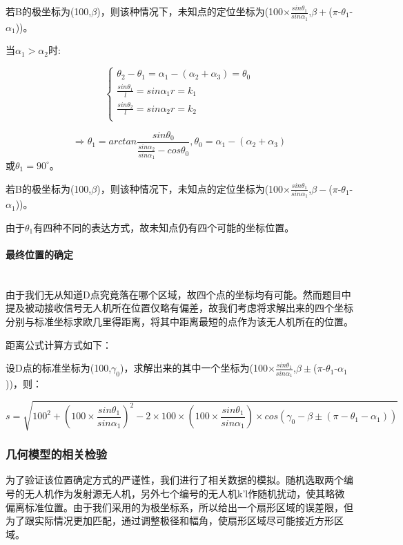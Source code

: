 \documentclass{ctexart}
\newcommand{\subsubsubsection}[1]{\paragraph{#1}\mbox{}\\}
\begin{document}
若B的极坐标为(100,$\beta$)，则该种情况下，未知点的定位坐标为(100$\times\frac{sin\theta_1}{sin\alpha_1}$,$\beta +$($\pi$-$\theta_1$-$\alpha_1$))。


当$\alpha_1 > \alpha_2$时:

\begin{equation}
    \left\{
              \begin{array}{ll}
                \theta_2-\theta_1=\alpha_1-(\alpha_2+\alpha_3)=\theta_0\\
                \frac{sin\theta_1}{l}={sin\alpha_1}{r}=k_1\\
                \frac{sin\theta_2}{l}={sin\alpha_2}{r}=k_2\\

              \end{array}
            \right.
\end{equation}

\[
    \Rightarrow \theta_1=arctan\frac{sin\theta_0}{\frac{sin\alpha_2}{sin\alpha_1}-cos\theta_0},\theta_0=\alpha_1-(\alpha_2+\alpha_3)
\]
或$\theta_1=90^{\circ}$。

若B的极坐标为(100,$\beta$)，则该种情况下，未知点的定位坐标为(100$\times\frac{sin\theta_1}{sin\alpha_1}$,$\beta -$($\pi$-$\theta_1$-$\alpha_1$))。

由于$\theta_1$有四种不同的表达方式，故未知点仍有四个可能的坐标位置。 

\subsubsubsection{最终位置的确定}

由于我们无从知道D点究竟落在哪个区域，故四个点的坐标均有可能。然而题目中提及被动接收信号无人机所在位置仅略有偏差，故我们考虑将求解出来的四个坐标分别与标准坐标求欧几里得距离，将其中距离最短的点作为该无人机所在的位置。

距离公式计算方式如下：

设D点的标准坐标为(100,$\gamma_0$)，求解出来的其中一个坐标为(100$\times\frac{sin\theta_1}{sin\alpha_1}$,$\beta \pm$($\pi$-$\theta_1$-$\alpha_1$))，则：

\[
 s=\sqrt{100^2+(100\times\frac{sin\theta_1}{sin\alpha_1})^2-2\times100\times(100\times\frac{sin\theta_1}{sin\alpha_1})\times cos(\gamma_0-\beta \pm(\pi-\theta_1-\alpha_1))}
\]

\subsubsection{几何模型的相关检验}

为了验证该位置确定方式的严谨性，我们进行了相关数据的模拟。随机选取两个编号的无人机作为发射源无人机，另外七个编号的无人机k'l作随机扰动，使其略微偏离标准位置。由于我们采用的为极坐标系，所以给出一个扇形区域的误差限，但为了跟实际情况更加匹配，通过调整极径和幅角，使扇形区域尽可能接近方形区域。
\end{document}
